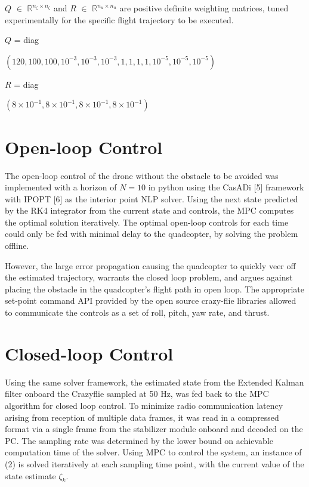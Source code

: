 \documentclass[conference]{IEEEtran}
\begin{document}
 $Q$ $\in$ $\mathbb{R}^{n_{\zeta} \times n_{\zeta}}$ and $R$ $\in$ $\mathbb{R}^{n_{u} \times n_{u}}$ are positive definite weighting matrices, tuned experimentally for the specific flight trajectory to be executed.
\begin{flushleft}
\begin{small}
$Q$ = diag\begin{footnotesize}$(120, 100, 100, 10^{-3}, 10^{-3},10^{-3},1, 1, 1, 1, 10^{-5}, 10^{-5}, 10^{-5})$\\
\end{footnotesize}
$R$ = diag\begin{footnotesize}$(8 \times 10^{-1}, 8\times 10^{-1}, 8\times 10^{-1}, 8\times 10^{-1})$\\
\end{footnotesize}
\end{small}
\end{flushleft}

\section{Open-loop Control }\label{Section4}
The open-loop control of the drone without the obstacle to be avoided was implemented with a horizon of $N = 10$ in python using the CasADi [5] framework with IPOPT [6] as the interior point NLP solver. Using the next state predicted by the RK4 integrator from the current state and controls, the MPC computes the optimal solution iteratively. The optimal open-loop controls for each time could only be fed with minimal delay to the quadcopter, by solving the problem offline. 


However, the large error propagation causing the quadcopter to quickly veer off the estimated trajectory, warrants the closed loop problem, and argues against placing the obstacle in the quadcopter's flight path in open loop.
The appropriate set-point command API provided by the open source crazy-flie libraries allowed to communicate the controls as a set of roll, pitch, yaw rate, and thrust. 

\section{Closed-loop Control }\label{Section5}
Using the same solver framework, the  estimated state from the Extended Kalman filter onboard the Crazyflie sampled at 50 Hz, was fed back to the MPC algorithm for closed loop control. To minimize radio communication latency arising from reception of multiple data frames, it was read in a compressed format via a single frame from the stabilizer module onboard and decoded on the PC. The sampling rate was determined by the lower bound on achievable computation time of the solver. Using MPC to control the system, an instance of (2) is solved iteratively at each sampling time point, with the current value of the state estimate $\zeta_k$. 
\end{document}
